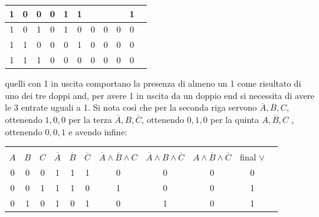 \documentclass[a4paper,12pt, oneside]{book}
\begin{document}
\begin{esercizio}
\begin{center}
\begin{tabular}{|c|c|c|c|c|c|c|c|c|c|c|}
			1   & 0   & 0   & 0              & 1              & 1              &                  &                  &                 & 1            \\
			\hline
			1   & 0   & 1   & 0              & 1              & 0              & 0                & 0                & 0               & 0            \\
			\hline
			1   & 1   & 0   & 0              & 0              & 1              & 0                & 0                & 0               & 0            \\
			\hline
			1   & 1   & 1   & 0              & 0              & 0              & 0                & 0                & 0               & 0            \\
			\hline
		\end{tabular}
	\end{center}
	quelli con 1 in uscita comportano la presenza di almeno un 1 come risultato di uno dei tre doppi and, per avere 1 in uscita da un doppio end si necessita di avere le 3 entrate uguali a 1. Si nota così che per la seconda riga servono $\overline{A},\overline{B},C$, ottenendo $1,0,0$  per la terza $\overline{A}, B, \overline{C}$, ottenendo $0,1,0$ per la quinta $A, \overline{B}, C$ , ottenendo $0,0,1$ e avendo infine:
	\begin{center}
		\begin{tabular}{|c|c|c|c|c|c|c|c|c|c|c|}
			\hline
			    &     &     &                &                &                &                                           &                                           &                                          &              \\
			$A$ & $B$ & $C$ & $\overline{A}$ & $\overline{B}$ & $\overline{C}$ & $\overline{A}\wedge \overline{B}\wedge C$ & $\overline{A}\wedge B\wedge\overline{C} $ & $A\wedge \overline{B}\wedge\overline{C}$ & final $\vee$ \\
			\hline
			0   & 0   & 0   & 1              & 1              & 1              & 0                                         & 0                                         & 0                                        & 0            \\
			\hline
			0   & 0   & 1   & 1              & 1              & 0              & 1                                         & 0                                         & 0                                        & 1            \\
			\hline
			0   & 1   & 0   & 1              & 0              & 1              & 0                                         & 1                                         & 0                                        & 1            \\

\end{tabular}
\end{center}
\end{esercizio}
\end{document}
